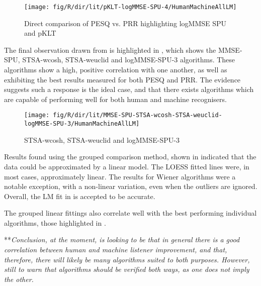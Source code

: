 \begin{figure}[p]
\noindent \begin{centering}
\texttt{[image: fig/R/dir/lit/pKLT-logMMSE-SPU-4/HumanMachineAllLM]}
\par\end{centering}

\protect\caption{\label{fig:direct-pklt-logmmse-spu-4}Direct comparison of \acs{PESQ}
vs. \acs{PRR} highlighting \acs{logMMSE} \acs{SPU} and \acs{pKLT}}
\end{figure}


The final observation drawn from  is highlighted
in , which shows the \ac{MMSE-SPU}, \ac{STSA-wcosh},
\ac{STSA-weuclid} and \ac{logMMSE-SPU-3} algorithms. These algorithms
show a high, positive correlation with one another, as well as exhibiting
the best results measured for both \ac{PESQ} and \ac{PRR}. The evidence
suggests such a response is the ideal case, and that there exists
algorithms which are capable of performing well for both human and
machine recognisers.

\begin{figure}[p]
\noindent \begin{centering}
\texttt{[image: fig/R/dir/lit/MMSE-SPU-STSA-wcosh-STSA-weuclid-logMMSE-SPU-3/HumanMachineAllLM]}
\par\end{centering}

\protect\caption{\label{fig:direct-highcorr}\acs{STSA-wcosh}, \acs{STSA-weuclid}
and \acs{logMMSE-SPU-3}}
\end{figure}


Results found using the grouped comparison method, shown in 
indicated that the data could be approximated by a linear model. The
\ac{LOESS} fitted lines were, in most cases, approximately linear.
The results for Wiener algorithms were a notable exception, with a
non-linear variation, even when the outliers are ignored. Overall,
the \ac{LM} fit in  is accepted to be
accurate.

The grouped linear fittings also correlate well with the best performing
individual algorithms, those highlighted in .

{*}{*}\textit{Conclusion, at the moment, is looking to be that in
general there is a good correlation between human and machine listener
improvement, and that, therefore, there will likely be many algorithms
suited to both purposes. However, still to warn that algorithms should
be verified both ways, as one does not imply the other.}


